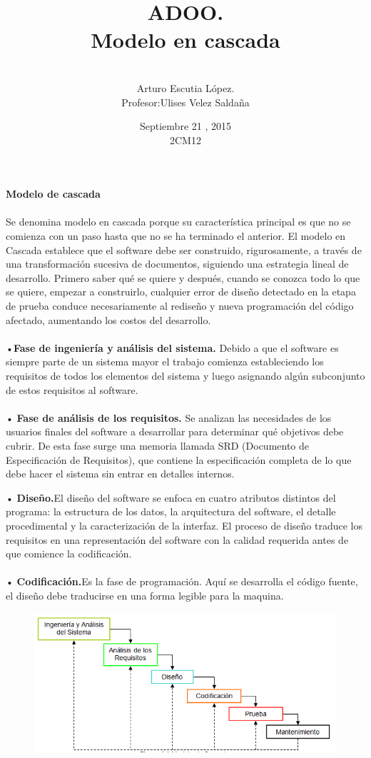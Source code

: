 \documentclass{article}
\title{\Huge ADOO.\vspace{1 cm}  \\ Modelo en cascada \vspace{1 cm} }
\author{\\ \Huge Arturo Escutia López.\vspace{2 cm}\\ \Huge Profesor:Ulises Velez Saldaña}
\date{\Huge\vspace{2 cm}Septiembre 21 , 2015 \Huge  \vspace{2 cm} \\2CM12 \vspace{4 cm}}
\begin{document}
 


\maketitle

 \LARGE  \textbf{Modelo de cascada }\\ \\
\large 
Se denomina modelo en cascada porque su característica principal es que no se comienza con un paso hasta que no se ha terminado el anterior. El modelo en Cascada establece que el software debe ser construido, rigurosamente, a través de una transformación sucesiva de documentos, siguiendo una estrategia lineal de desarrollo. Primero saber qué se quiere y después, cuando se conozca todo lo que se quiere, empezar a construirlo, cualquier error de diseño detectado en la etapa de prueba conduce
necesariamente al rediseño y nueva programación del código afectado, aumentando
los costos del desarrollo. \\ \\
•\textbf{Fase de ingeniería y análisis del sistema.} Debido a que el software es siempre parte de un sistema mayor el trabajo comienza estableciendo los requisitos de todos
los elementos del sistema y luego asignando algún subconjunto de estos requisitos al software.\\ \\
• \textbf{Fase de análisis de los requisitos.} Se analizan las necesidades de los
usuarios finales del software a desarrollar para determinar qué objetivos debe
cubrir. De esta fase surge una memoria llamada SRD (Documento de
Especificación de Requisitos), que contiene la especificación completa de lo
que debe hacer el sistema sin entrar en detalles internos.

 \vspace{4 cm}
• \textbf{Diseño.}El diseño del software se enfoca en cuatro atributos distintos del programa: la estructura de los datos, la arquitectura del software, el detalle procedimental y la caracterización de la interfaz. El proceso de diseño traduce los requisitos en una representación del software con la calidad requerida antes de que comience la codificación. 
\\ \\
• \textbf{Codificación.}Es la fase de programación. Aquí se desarrolla el código fuente, el diseño debe traducirse en una forma legible para la maquina. 

\begin{figure}
	\centering
	\includegraphics[width=1\linewidth, height=.4\textheight]{a}
	\caption{}
	\label{fig:a}
\end{figure}
\end{document}
